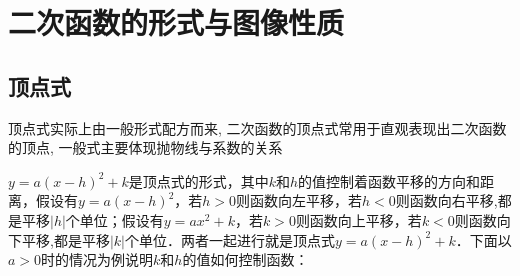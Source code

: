 \section{二次函数的形式与图像性质}


\subsection{顶点式}
\label{subsetionL:topponit}

顶点式实际上由一般形式配方而来, 二次函数的顶点式常用于直观表现出二次函数的顶点, 一般式主要体现抛物线与系数的关系

\(y=a(x-h)^2+k\)是顶点式的形式，其中\(k\)和\(h\)的值控制着函数平移的方向和距离，假设有\(y=a(x-h)^2\)，若\(h>0\)则函数向左平移，若\(h<0\)则函数向右平移,都是平移\(|h|\)个单位；假设有\(y=ax^2+k\)，若\(k>0\)则函数向上平移，若\(k<0\)则函数向下平移,都是平移\(|k|\)个单位．两者一起进行就是顶点式\(y=a(x-h)^2+k\)．下面以\(a>0\)时的情况为例说明\(k\)和\(h\)的值如何控制函数：
